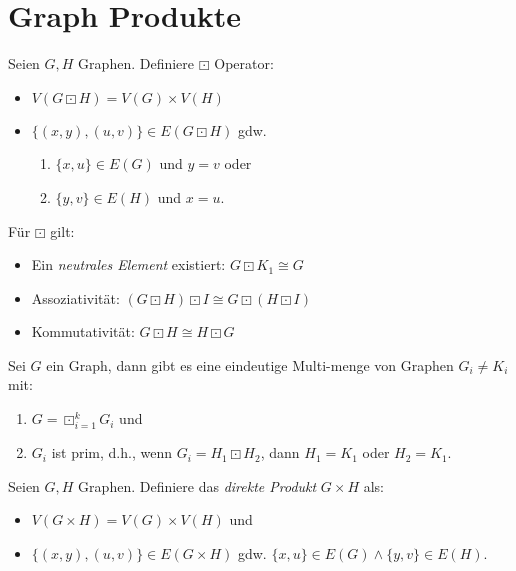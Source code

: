 \chapter{Graph Produkte}

\begin{definition}[Produkt]
    Seien $ G, H $ Graphen.
    Definiere $ \boxdot $ Operator:
    \begin{itemize}
        \item $ V(G \boxdot H) = V(G) \times V(H) $
        \item $ \{ (x, y), (u, v) \} \in E(G \boxdot H) $ gdw. \begin{enumerate}
            \item $ \{ x, u \} \in E(G) $ und $ y = v $ oder
            \item $ \{ y, v \} \in E(H) $ und $ x = u $.
        \end{enumerate}
    \end{itemize}
\end{definition}

\begin{proposition}
    Für $ \boxdot $ gilt:
    \begin{itemize}
        \item Ein \textit{neutrales Element} existiert: $ G \boxdot K_1 \cong G $
        \item Assoziativität: $ (G \boxdot H) \boxdot I \cong G \boxdot (H \boxdot I) $
        \item Kommutativität: $ G \boxdot H \cong H \boxdot G $
    \end{itemize}
\end{proposition}

\begin{theorem}
    Sei $ G $ ein Graph, dann gibt es eine eindeutige Multi-menge von Graphen $ G_i \neq K_i $ mit:
    \begin{enumerate}
        \item $ G = \boxdot^k_{i = 1} G_i $ und
        \item $ G_i $ ist prim, d.h., wenn $ G_i = H_1 \boxdot H_2 $, dann $ H_1 = K_1 $ oder $ H_2 = K_1 $.
    \end{enumerate}
\end{theorem}

\begin{definition}
    Seien $ G, H $ Graphen.
    Definiere das \textit{direkte Produkt} $ G \times H $ als:
    \begin{itemize}
        \item $ V(G \times H) = V(G) \times V(H) $ und
        \item $ \{ (x, y), (u, v) \} \in E(G \times H) $ gdw. $ \{ x, u\} \in E(G) \land \{ y, v \} \in E(H) $.
    \end{itemize}
\end{definition}

